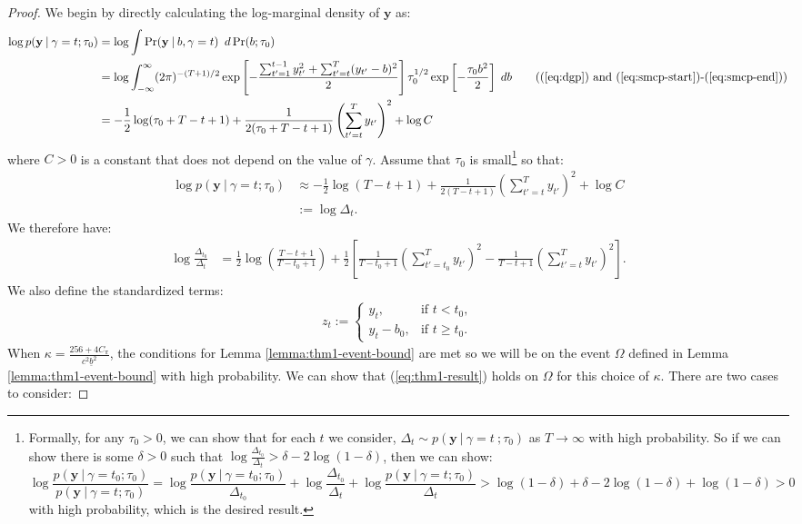 \begin{proof}
We begin by directly calculating the log-marginal density of $\mathbf{y}$ as: 
\begin{align*}
    \log p(\mathbf{y} \:|\:\gamma = t ; \tau_0) &= \log \int \Pr(\mathbf{y} \:|\:b,\gamma = t) \:\; d\Pr(b;\tau_0) \\
    &= \log \int_{-\infty}^\infty (2\pi)^{-(T+1)/2} \exp\left[-\frac{\sum_{t'=1}^{t-1} y_{t'}^2 + \sum_{t'=t}^{T} (y_{t'} - b)^2}{2}\right] \tau_0^{1/2}\exp\left[-\frac{\tau_0 b^2}{2}\right] \; db \tag{(\ref{eq:dgp}) and (\ref{eq:smcp-start})-(\ref{eq:smcp-end})} \\
    &= -\frac{1}{2}\log(\tau_0 + T - t + 1) + \frac{1}{2(\tau_0 + T-t+1)}\left(\sum_{t'=t}^{T} y_{t'}\right)^2 + \log C
\end{align*}
where $C>0$ is a constant that does not depend on the value of $\gamma$. Assume that $\tau_0$ is small\footnote{Formally, for any $\tau_0 >0$, we can show that for each $t$ we consider, $\Delta_t \sim p(\mathbf{y} \:|\:\gamma = t \:; \tau_0)$ as $T \to \infty$ with high probability. So if we can show there is some $\delta > 0$ such that $\log \frac{\Delta_{t_0}}{\Delta_t} > \delta-2\log(1-\delta)$, then we can show: $$\log \frac{p(\mathbf{y} \:|\:\gamma = t_0 ; \tau_0)}{p(\mathbf{y} \:|\:\gamma = t ; \tau_0)} = \log\frac{p(\mathbf{y} \:|\:\gamma = t_0 ; \tau_0)}{\Delta_{t_0}} + \log \frac{\Delta_{t_0}}{\Delta_t} + \log \frac{p(\mathbf{y} \:|\:\gamma = t ; \tau_0)}{\Delta_t} > \log(1-\delta) + \delta-2\log(1-\delta) +\log(1-\delta) > 0$$ with high probability, which is the desired result.} so that: 
\begin{align*}
    \log p(\mathbf{y} \:|\: \gamma = t; \tau_0) &\approx -\frac{1}{2}\log(T - t + 1) + \frac{1}{2(T-t+1)}\left(\sum_{t'=t}^{T} y_{t'}\right)^2 + \log C \\
    &:= \log \Delta_t.
\end{align*}
We therefore have:
\begin{align*}
    \log \frac{\Delta_{t_0}}{\Delta_t} &= \frac{1}{2} \log \left(\frac{T-t+1}{T-t_0+1}\right) + \frac{1}{2} \left[\frac{1}{T-t_0+1}\left(\sum_{t'=t_0}^{T} y_{t'}\right)^2- \frac{1}{T-t+1}\left(\sum_{t'=t}^{T} y_{t'}\right)^2\right].
\end{align*}
We also define the standardized terms:
\begin{align*}
    z_{t} :=
    \begin{cases}
        y_t, & \text{if } t < t_0, \\
        y_t - b_0, & \text{if } t \geq t_0.
    \end{cases}
\end{align*}
When $\kappa = \frac{256 + 4C_\pi}{c^2\underline{b}^2}$, the conditions for Lemma \ref{lemma:thm1-event-bound} are met so we will be on the event $\Omega$ defined in  Lemma \ref{lemma:thm1-event-bound} with high probability. We can show that (\ref{eq:thm1-result}) holds on $\Omega$ for this choice of $\kappa$. There are two cases to consider:


\end{proof}
